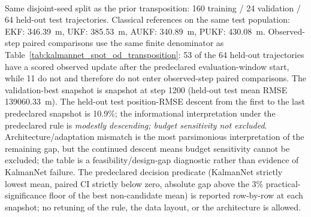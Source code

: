 \begin{table}[t]
  \\[2pt] {\footnotesize Same disjoint-seed split as the prior transposition: 160 training / 24 validation / 64 held-out test trajectories. Classical references on the same test population: EKF: 346.39~m, UKF: 385.53~m, AUKF: 340.89~m, PUKF: 430.08~m. Observed-step paired comparisons use the same finite denominator as Table~\ref{tab:kalmannet_spot_od_transposition}: 53 of the 64 held-out trajectories have a scored observed update after the predeclared evaluation-window start, while 11 do not and therefore do not enter observed-step paired comparisons. The validation-best snapshot is snapshot at step 1200 (held-out test mean RMSE 139060.33~m). The held-out test position-RMSE descent from the first to the last predeclared snapshot is 10.9\%; the informational interpretation under the predeclared rule is \emph{modestly descending; budget sensitivity not excluded}. Architecture/adaptation mismatch is the most parsimonious interpretation of the remaining gap, but the continued descent means budget sensitivity cannot be excluded; the table is a feasibility/design-gap diagnostic rather than evidence of KalmanNet failure. The predeclared decision predicate (KalmanNet strictly lowest mean, paired CI strictly below zero, absolute gap above the 3\% \mbox{practical-significance} floor of the best non-candidate mean) is reported row-by-row at each snapshot; no retuning of the rule, the data layout, or the architecture is allowed.}
\end{table}